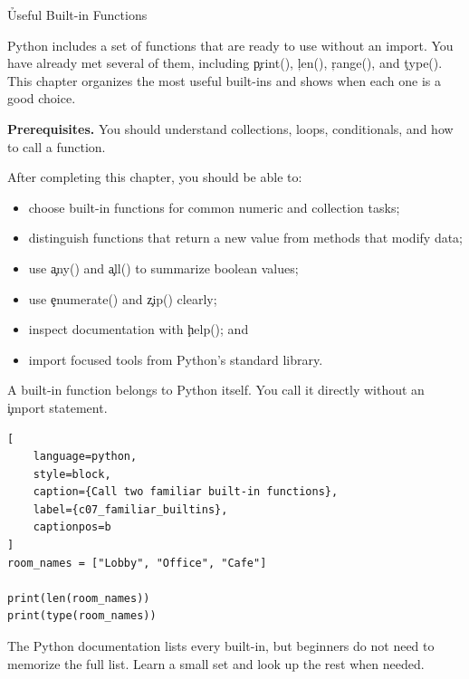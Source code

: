 
\h{Useful Built-in Functions}
\label{ch:07}

Python includes a set of functions that are ready to use without an import.
You have already met several of them, including \c{print()}, \c{len()},
\c{range()}, and \c{type()}. This chapter organizes the most useful built-ins
and shows when each one is a good choice.

\begin{NoteBox}
\textbf{Prerequisites.} You should understand collections, loops,
conditionals, and how to call a function.
\end{NoteBox}

\begin{tcolorbox}[title=Learning outcomes,colframe=orange,colback=white,arc=2mm]
After completing this chapter, you should be able to:
\begin{itemize}
    \item choose built-in functions for common numeric and collection tasks;
    \item distinguish functions that return a new value from methods that modify data;
    \item use \c{any()} and \c{all()} to summarize boolean values;
    \item use \c{enumerate()} and \c{zip()} clearly;
    \item inspect documentation with \c{help()}; and
    \item import focused tools from Python's standard library.
\end{itemize}
\end{tcolorbox}


A built-in function belongs to Python itself. You call it directly without an
\c{import} statement.

\begin{lstlisting}[
    language=python,
    style=block,
    caption={Call two familiar built-in functions},
    label={c07_familiar_builtins},
    captionpos=b
]
room_names = ["Lobby", "Office", "Cafe"]

print(len(room_names))
print(type(room_names))
\end{lstlisting}

The Python documentation lists every built-in, but beginners do not need to
memorize the full list. Learn a small set and look up the rest when needed.

